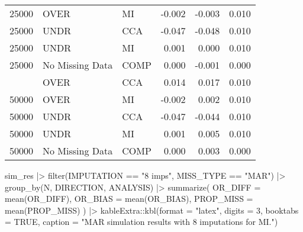 \documentclass[
  letterpaper,
  DIV=11,
  numbers=noendperiod]{scrartcl}
\newenvironment{Shaded}{\begin{snugshade}}{\end{snugshade}}
\newcommand{\AttributeTok}[1]{\textcolor[rgb]{0.40,0.45,0.13}{#1}}
\newcommand{\ConstantTok}[1]{\textcolor[rgb]{0.56,0.35,0.01}{#1}}
\newcommand{\DecValTok}[1]{\textcolor[rgb]{0.68,0.00,0.00}{#1}}
\newcommand{\FunctionTok}[1]{\textcolor[rgb]{0.28,0.35,0.67}{#1}}
\newcommand{\NormalTok}[1]{\textcolor[rgb]{0.00,0.23,0.31}{#1}}
\newcommand{\SpecialCharTok}[1]{\textcolor[rgb]{0.37,0.37,0.37}{#1}}
\newcommand{\StringTok}[1]{\textcolor[rgb]{0.13,0.47,0.30}{#1}}
\begin{document}
\begin{table}
\begin{tabular}[t]{rllrrr}
25000 & OVER & MI & -0.002 & -0.003 & 0.010\\
25000 & UNDR & CCA & -0.047 & -0.048 & 0.010\\
25000 & UNDR & MI & 0.001 & 0.000 & 0.010\\
25000 & No Missing Data & COMP & 0.000 & -0.001 & 0.000\\
\addlinespace
50000 & OVER & CCA & 0.014 & 0.017 & 0.010\\
50000 & OVER & MI & -0.002 & 0.002 & 0.010\\
50000 & UNDR & CCA & -0.047 & -0.044 & 0.010\\
50000 & UNDR & MI & 0.001 & 0.005 & 0.010\\
50000 & No Missing Data & COMP & 0.000 & 0.003 & 0.000\\
\bottomrule
\end{tabular}
\end{table}

\begin{Shaded}
\begin{Highlighting}[]
\NormalTok{sim\_res }\SpecialCharTok{|\textgreater{}} 
  \FunctionTok{filter}\NormalTok{(IMPUTATION }\SpecialCharTok{==} \StringTok{"8 imps"}\NormalTok{, }
\NormalTok{         MISS\_TYPE }\SpecialCharTok{==} \StringTok{"MAR"}\NormalTok{) }\SpecialCharTok{|\textgreater{}}
  \FunctionTok{group\_by}\NormalTok{(N, DIRECTION, ANALYSIS) }\SpecialCharTok{|\textgreater{}}
  \FunctionTok{summarize}\NormalTok{(}
    \AttributeTok{OR\_DIFF =} \FunctionTok{mean}\NormalTok{(OR\_DIFF),}
    \AttributeTok{OR\_BIAS =} \FunctionTok{mean}\NormalTok{(OR\_BIAS),}
    \AttributeTok{PROP\_MISS =} \FunctionTok{mean}\NormalTok{(PROP\_MISS)}
\NormalTok{  ) }\SpecialCharTok{|\textgreater{}} 
\NormalTok{  kableExtra}\SpecialCharTok{::}\FunctionTok{kbl}\NormalTok{(}\AttributeTok{format =} \StringTok{"latex"}\NormalTok{, }
                  \AttributeTok{digits =} \DecValTok{3}\NormalTok{, }
                  \AttributeTok{booktabs =} \ConstantTok{TRUE}\NormalTok{,}
                  \AttributeTok{caption =} \StringTok{"MAR simulation results with 8 imputations for MI."}\NormalTok{)}
\end{Highlighting}
\end{Shaded}
\end{document}
